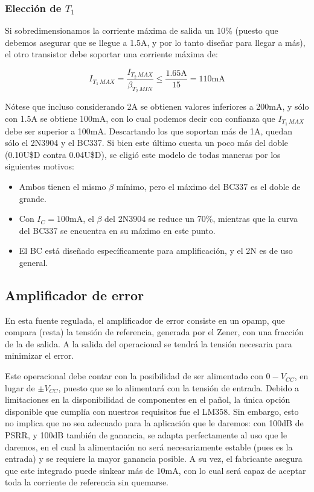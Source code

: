 \documentclass[e2_tp1_main.tex]{subfiles}
\begin{document}
\subsubsection{Elecci\'on de $T_1$}

Si sobredimensionamos la corriente m\'axima de salida un 10\% (puesto que debemos asegurar que se llegue a 1.5A, y por lo tanto dise\~nar para llegar a m\'as), el otro transistor debe soportar una corriente m\'axima de:

\[I_{T_1\, MAX} = 
\frac{I_{T_2\, MAX}}{\beta_{T_2\,MIN}} \leq
\frac{1.65\mathrm{A}}{15} = 110\mathrm{mA} \]

N\'otese que incluso considerando 2A se obtienen valores inferiores a 200mA, y s\'olo con 1.5A se obtiene 100mA, con lo cual podemos decir con confianza que $I_{T_1\, MAX}$ debe ser superior a 100mA. Descartando los que soportan m\'as de 1A, quedan s\'olo el 2N3904 y el BC337. Si bien este \'ultimo cuesta un poco m\'as del doble (0.10U\$D contra 0.04U\$D), se eligi\'o este modelo de todas maneras por los siguientes motivos:

\begin{itemize}
	\item Ambos tienen el mismo $\beta$ m\'inimo, pero el m\'aximo del BC337 es el doble de grande.
	\item Con $I_C = 100$mA, el $\beta$ del 2N3904 se reduce un 70\%, mientras que la curva del BC337 se encuentra en su m\'aximo en este punto.
	\item El BC est\'a dise\~nado espec\'ificamente para amplificaci\'on, y el 2N es de uso general.
\end{itemize}

  
 \subsection{Amplificador de error}

En esta fuente regulada, el amplificador de error consiste en un opamp, que compara (resta) la tensi\'on de referencia, generada por el Zener, con una fracci\'on de la de salida. A la salida del operacional se tendr\'a la tensi\'on necesaria para minimizar el error. 

Este operacional debe contar con la posibilidad de ser alimentado con $0 - V_{CC}$, en lugar de $\pm V_{CC}$, puesto que se lo alimentar\'a con la tensi\'on de entrada. Debido a limitaciones en la disponibilidad de componentes en el pa\~nol, la \'unica opci\'on disponible que cumpl\'ia con nuestros requisitos fue el LM358. Sin embargo, esto no implica que no sea adecuado para la aplicaci\'on que le daremos: con 100dB de PSRR, y 100dB tambi\'en de ganancia, se adapta perfectamente al uso que le daremos, en el cual la alimentaci\'on no ser\'a necesariamente estable (pues es la entrada) y se requiere la mayor ganancia posible. A su vez, el fabricante asegura que este integrado puede sinkear m\'as de 10mA, con lo cual ser\'a capaz de aceptar toda la corriente de referencia sin quemarse.
\end{document}
